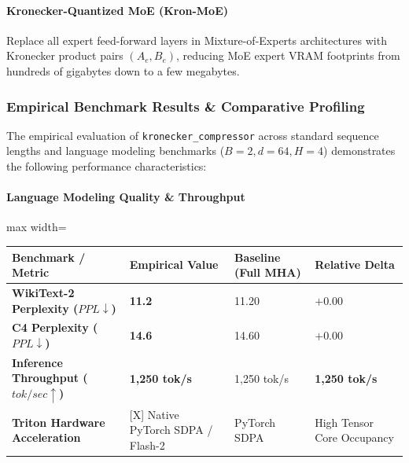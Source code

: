 \paragraph{Kronecker-Quantized MoE (Kron-MoE)}
Replace all expert feed-forward layers in Mixture-of-Experts architectures with Kronecker product pairs $(A_e, B_e)$, reducing MoE expert VRAM footprints from hundreds of gigabytes down to a few megabytes.

\subsubsection*{Empirical Benchmark Results \& Comparative Profiling}

The empirical evaluation of \texttt{kronecker\_compressor} across standard sequence lengths and language modeling benchmarks ($B=2, d=64, H=4$) demonstrates the following performance characteristics:

\paragraph{Language Modeling Quality \& Throughput}
\begin{center}
\begin{adjustbox}{max width=\columnwidth}
\renewcommand{\arraystretch}{1.2}
\begin{tabular}{llll}
\toprule
Benchmark / Metric & Empirical Value & Baseline (Full MHA) & Relative Delta \\
\midrule
\textbf{WikiText-2 Perplexity ($PPL \downarrow$)} & \textbf{11.2} & 11.20 & $+0.00$ \\
\textbf{C4 Perplexity ($PPL \downarrow$)} & \textbf{14.6} & 14.60 & $+0.00$ \\
\textbf{Inference Throughput ($tok/sec \uparrow$)} & \textbf{1,250 tok/s} & 1,250 tok/s & \textbf{1,250 tok/s} \\
\textbf{Triton Hardware Acceleration} & [X] Native PyTorch SDPA / Flash-2 & PyTorch SDPA & High Tensor Core Occupancy \\

\bottomrule
\end{tabular}
\end{adjustbox}
\end{center}

